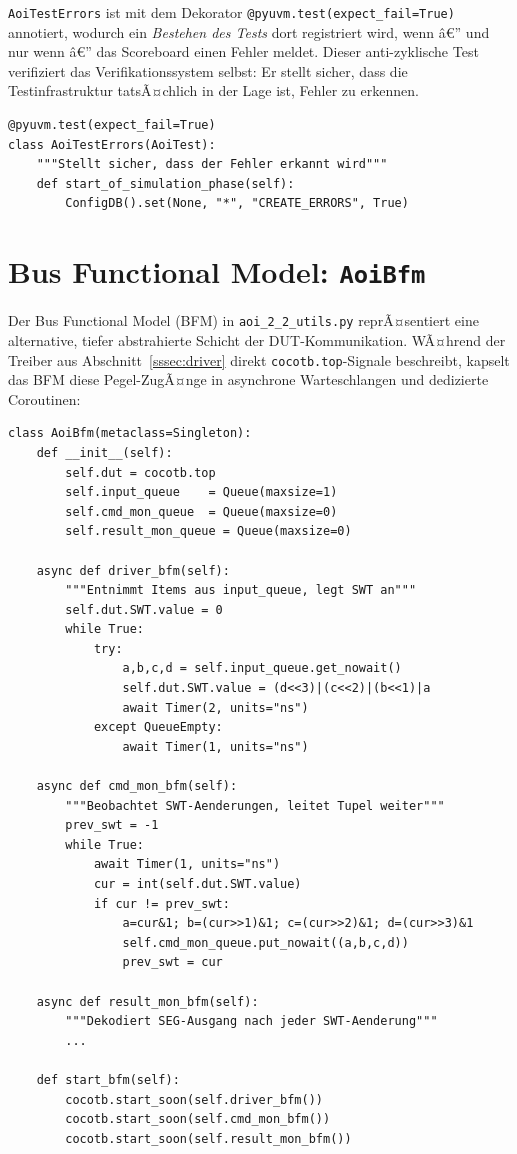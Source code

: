 ﻿\documentclass[12pt,a4paper]{report}
\begin{document}
\texttt{AoiTestErrors} ist mit dem Dekorator \texttt{@pyuvm.test(expect\_fail=True)}
annotiert, wodurch ein \emph{Bestehen des Tests} dort registriert wird,
wenn â€” und nur wenn â€” das Scoreboard einen Fehler meldet. Dieser anti-zyklische
Test verifiziert das Verifikationssystem selbst: Er stellt sicher, dass die
Testinfrastruktur tatsÃ¤chlich in der Lage ist, Fehler zu erkennen.

\begin{lstlisting}[style=pythonstyle, caption={Fehlerinjektions-Test \texttt{AoiTestErrors}}]
@pyuvm.test(expect_fail=True)
class AoiTestErrors(AoiTest):
    """Stellt sicher, dass der Fehler erkannt wird"""
    def start_of_simulation_phase(self):
        ConfigDB().set(None, "*", "CREATE_ERRORS", True)
\end{lstlisting}

\section{Bus Functional Model: \texttt{AoiBfm}}
\label{subsec:bfm}

Der Bus Functional Model (BFM) in \texttt{aoi\_2\_2\_utils.py} reprÃ¤sentiert
eine alternative, tiefer abstrahierte Schicht der DUT-Kommunikation. WÃ¤hrend
der Treiber aus Abschnitt~\ref{sssec:driver} direkt \texttt{cocotb.top}-Signale
beschreibt, kapselt das BFM diese Pegel-ZugÃ¤nge in asynchrone Warteschlangen
und dedizierte Coroutinen:

\begin{lstlisting}[style=pythonstyle, caption={BFM-Struktur mit Schreib- und Ãœberwachungs-Koroutinen}]
class AoiBfm(metaclass=Singleton):
    def __init__(self):
        self.dut = cocotb.top
        self.input_queue    = Queue(maxsize=1)
        self.cmd_mon_queue  = Queue(maxsize=0)
        self.result_mon_queue = Queue(maxsize=0)

    async def driver_bfm(self):
        """Entnimmt Items aus input_queue, legt SWT an"""
        self.dut.SWT.value = 0
        while True:
            try:
                a,b,c,d = self.input_queue.get_nowait()
                self.dut.SWT.value = (d<<3)|(c<<2)|(b<<1)|a
                await Timer(2, units="ns")
            except QueueEmpty:
                await Timer(1, units="ns")

    async def cmd_mon_bfm(self):
        """Beobachtet SWT-Aenderungen, leitet Tupel weiter"""
        prev_swt = -1
        while True:
            await Timer(1, units="ns")
            cur = int(self.dut.SWT.value)
            if cur != prev_swt:
                a=cur&1; b=(cur>>1)&1; c=(cur>>2)&1; d=(cur>>3)&1
                self.cmd_mon_queue.put_nowait((a,b,c,d))
                prev_swt = cur

    async def result_mon_bfm(self):
        """Dekodiert SEG-Ausgang nach jeder SWT-Aenderung"""
        ...

    def start_bfm(self):
        cocotb.start_soon(self.driver_bfm())
        cocotb.start_soon(self.cmd_mon_bfm())
        cocotb.start_soon(self.result_mon_bfm())
\end{lstlisting}
\end{document}
